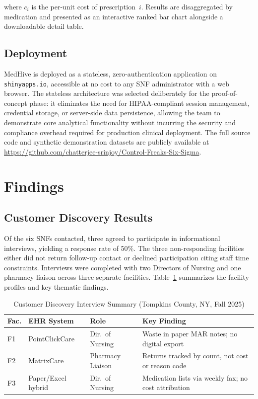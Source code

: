 \documentclass[letterpaper, 10pt, conference]{IEEEconf}
\begin{document}
where $c_i$ is the per-unit cost of prescription~$i$.
Results are disaggregated by medication and presented as an interactive
ranked bar chart alongside a downloadable detail table.

\subsection{Deployment}

MedHive is deployed as a stateless, zero-authentication application on
\texttt{shinyapps.io}, accessible at no cost to any SNF administrator with
a web browser.
The stateless architecture was selected deliberately for the proof-of-concept
phase: it eliminates the need for HIPAA-compliant session management,
credential storage, or server-side data persistence, allowing the team to
demonstrate core analytical functionality without incurring the security and
compliance overhead required for production clinical deployment.
The full source code and synthetic demonstration datasets are publicly available
at \url{https://github.com/chatterjee-srinjoy/Control-Freaks-Six-Sigma}.

\section{Findings}

\subsection{Customer Discovery Results}

Of the six SNFs contacted, three agreed to participate in informational
interviews, yielding a response rate of 50\%.
The three non-responding facilities either did not return follow-up contact
or declined participation citing staff time constraints.
Interviews were completed with two Directors of Nursing and one pharmacy
liaison across three separate facilities.
Table~\ref{table:interviews} summarizes the facility profiles and key
thematic findings.

\begin{table}[h]
\caption{Customer Discovery Interview Summary (Tompkins County, NY, Fall 2025)}
\label{table:interviews}
\begin{center}
\footnotesize
\begin{tabularx}{\columnwidth}{|p{0.55cm}|p{2.4cm}|p{1.6cm}|X|}
\hline
\textbf{Fac.} & \textbf{EHR System} & \textbf{Role} & \textbf{Key Finding} \\
\hline
F1 & PointClickCare & Dir.\ of Nursing & Waste in paper MAR notes; no digital export \\
\hline
F2 & MatrixCare & Pharmacy Liaison & Returns tracked by count, not cost or reason code \\
\hline
F3 & Paper/Excel hybrid & Dir.\ of Nursing & Medication lists via weekly fax; no cost attribution \\
\hline
\end{tabularx}
\end{center}
\end{table}
\end{document}
